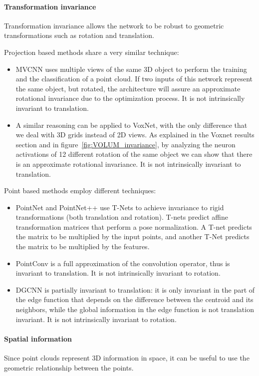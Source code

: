 \paragraph{Transformation invariance} Transformation invariance allows the network to be robust to geometric transformations such as rotation and translation.

Projection based methods share a very similar technique:
\begin{itemize}
    \item MVCNN uses multiple views of the same 3D object to perform the training and the classification of a point cloud. If two inputs of this network represent the same object, but rotated, the architecture will assure an approximate rotational invariance due to the optimization process. It is not intrinsically invariant to translation.
    \item A similar reasoning can be applied to VoxNet, with the only difference that we deal with 3D grids instead of 2D views. As explained in the Voxnet results section and in figure~\ref{fig:VOLUM_invariance}, by analyzing the neuron activations of 12 different rotation of the same object we can show that there is an approximate rotational invariance. It is not intrinsically invariant to translation.
\end{itemize}

Point based methods employ different techniques:
\begin{itemize}
    \item PointNet and PointNet++ use T-Nets to achieve invariance to rigid transformations (both translation and rotation). T-nets predict affine transformation matrices that perform a pose normalization. A T-net predicts the matrix to be multiplied by the input points, and another T-Net predicts the matrix to be multiplied by the features. %
    \item PointConv is a full approximation of the convolution operator, thus is invariant to translation. It is not intrinsically invariant to rotation.
    \item DGCNN is partially invariant to translation: it is only invariant in the part of the edge function that depends on the difference between the centroid and its neighbors, while the global information in the edge function is not translation invariant. It is not intrinsically invariant to rotation.
\end{itemize}

\paragraph{Spatial information} Since point clouds represent 3D information in space, it can be useful to use the geometric relationship between the points.

